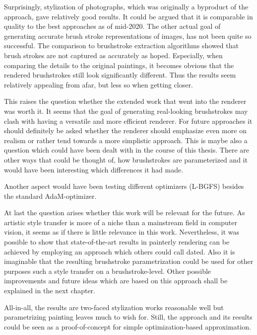 Surprisingly, stylization of photographs, which was originally a byproduct of the approach, gave relatively good results.
It could be argued that it is comparable in quality to the best approaches as of mid-2020.
The other actual goal of generating accurate brush stroke representations of images, has not been quite so successful.
The comparison to brushstroke extraction algorithms showed that brush strokes are not captured as accurately as hoped.
Especially, when comparing the details to the original paintings, it becomes obvious that the rendered brushstrokes still look significantly different.
Thus the results seem relatively appealing from afar, but less so when getting closer.

This raises the question whether the extended work that went into the renderer was worth it.
It seems that the goal of generating real-looking brushstrokes may clash with having a versatile and more efficient renderer.
For future approaches it should definitely be asked whether the renderer should emphasize even more on realism or rather tend towards a more simplistic approach. 
This is maybe also a question which could have been dealt with in the course of this thesis.
There are other ways that could be thought of, how brushstrokes are parameterized and it would have been interesting which differences it had made.

Another aspect would have been testing different optimizers (\eg L-BGFS) besides the standard AdaM-optimizer.

At last the question arises whether this work will be relevant for the future.
As artistic style transfer is more of a niche than a mainstream field in computer vision, it seems as if there is little relevance in this work.
Nevertheless, it was possible to show that state-of-the-art results in painterly rendering can be achieved by employing an approach which others could call dated.
Also it is imaginable that the resulting brushstroke parametrization could be used for other purposes such a style transfer on a brushstroke-level.
Other possible improvements and future ideas which are based on this approach shall be explained in the next chapter.

All-in-all, the results are two-faced stylization works reasonable well but parametrizing painting leaves much to wish for.
Still, the approach and its results could be seen as a proof-of-concept for simple optimization-based approximation.
